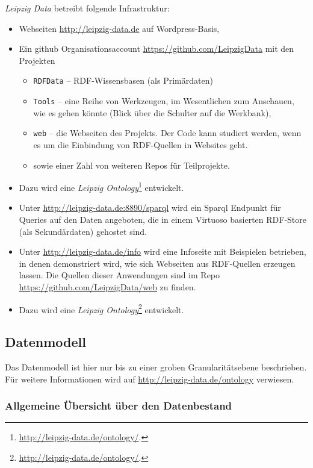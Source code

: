\documentclass[a4paper,11pt]{article}
\begin{document}
\emph{Leipzig Data} betreibt folgende Infrastruktur:
\begin{itemize}\itemsep0pt
\item Webseiten \url{http://leipzig-data.de} auf Wordpress-Basis,
\item Ein github Organisationsaccount \url{https://github.com/LeipzigData} mit
  den Projekten 
  \begin{itemize}\itemsep0pt
  \item \texttt{RDFData} – RDF-Wissensbasen (als Primärdaten)
  \item \texttt{Tools} – eine Reihe von Werkzeugen, im Wesentlichen zum
    Anschauen, wie es gehen könnte (Blick über die Schulter auf die Werkbank), 
  \item \texttt{web} – die Webseiten des Projekts. Der Code kann studiert
    werden, wenn es um die Einbindung von RDF-Quellen in Websites geht.
  \item sowie einer Zahl von weiteren Repos für Teilprojekte.
  \end{itemize}
\item Dazu wird eine \emph{Leipzig
  Ontology}\footnote{\url{http://leipzig-data.de/ontology/}.} entwickelt.
\item Unter \url{http://leipzig-data.de:8890/sparql} wird ein Sparql Endpunkt
  für Queries auf den Daten angeboten, die in einem Virtuoso basierten
  RDF-Store (als Sekundärdaten) gehostet sind.
\item Unter \url{http://leipzig-data.de/info} wird eine Infoseite mit
  Beispielen betrieben, in denen demonstriert wird, wie sich Webseiten aus
  RDF-Quellen erzeugen lassen.  Die Quellen dieser Anwendungen sind im Repo
  \url{https://github.com/LeipzigData/web} zu finden. 
\item Dazu wird eine \emph{Leipzig
  Ontology}\footnote{\url{http://leipzig-data.de/ontology/}.} entwickelt.
\end{itemize}

\subsection{Datenmodell}

Das Datenmodell ist hier nur bis zu einer groben Granularitätsebene
beschrieben.  Für weitere Informationen wird auf
\url{http://leipzig-data.de/ontology} verwiesen.

\subsubsection*{Allgemeine Übersicht über den Datenbestand}
\end{document}
